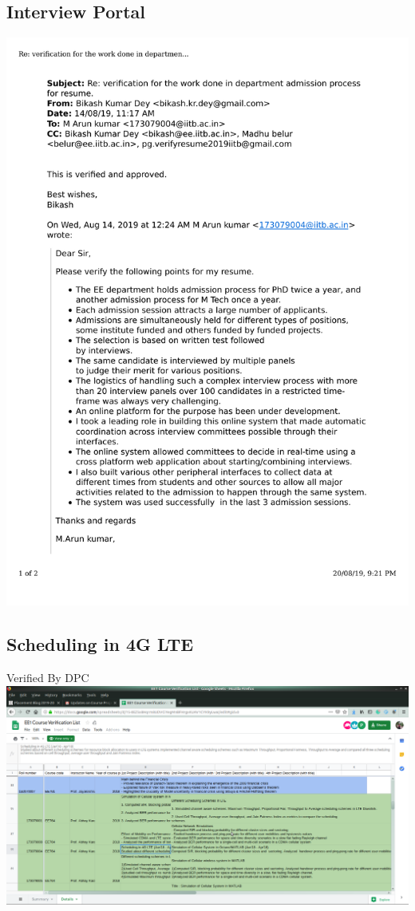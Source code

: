 \documentclass{article}
\begin{document}
	\subsection{Interview Portal}
		\includegraphics[page=1, scale=0.5]{proofs/Interview_portal.pdf}\\
	\subsection{Scheduling in 4G LTE}
		Verified By DPC\\
		\includegraphics[page=1, scale=0.25]{proofs/wireless_project.png}
\end{document}
